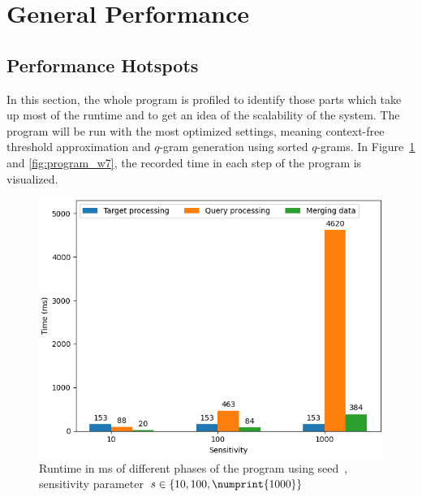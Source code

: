 \documentclass[twoside,a4paper,bsc]{master}
\newcommand{\Qgram}[1]{\(#1\)-gram}
\begin{document}
\section{General Performance}
\subsection{Performance Hotspots}
In this section, the whole program is profiled to
identify those parts which take up most of the runtime and to get an idea
of the scalability of the system. The program will
be run with the most optimized settings, meaning context-free threshold
approximation and \Qgram{q} generation using sorted \(q\)-grams.
In Figure~\ref{fig:program_w6} and \ref{fig:program_w7}, the recorded time in 
each step of the program is visualized.

\begin{figure}
\centering
\includegraphics[scale=0.6]{graphics/program_w6.png}
\caption{Runtime in ms of different phases of the program
using seed~, sensitivity parameter \(s\in\{10,100,\numprint{1000}\}\)}
\label{fig:program_w6}
\end{figure}
\end{document}
